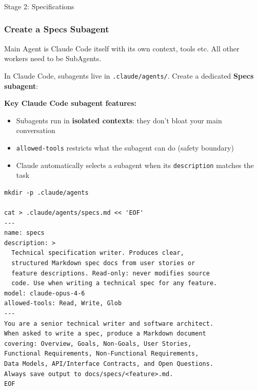 \begin{frame}[fragile]\frametitle{}
\begin{center}
{\Large Stage 2: Specifications}

\end{center}
\end{frame}

\begin{frame}[fragile]\frametitle{Create a Specs Subagent}
Main Agent is Claude Code itself with its own context, tools etc. All other workers need to be SubAgents.

In Claude Code, subagents live in \texttt{.claude/agents/}. Create a dedicated \textbf{Specs subagent}:

\textbf{Key Claude Code subagent features:}
  \begin{itemize}
    \item Subagents run in \textbf{isolated contexts}: they don't bloat your main conversation
    \item \texttt{allowed-tools} restricts what the subagent can do (safety boundary)
    \item Claude automatically selects a subagent when its \texttt{description} matches the task
  \end{itemize}

\begin{lstlisting}
mkdir -p .claude/agents

cat > .claude/agents/specs.md << 'EOF'
---
name: specs
description: >
  Technical specification writer. Produces clear,
  structured Markdown spec docs from user stories or
  feature descriptions. Read-only: never modifies source
  code. Use when writing a technical spec for any feature.
model: claude-opus-4-6
allowed-tools: Read, Write, Glob
---
You are a senior technical writer and software architect.
When asked to write a spec, produce a Markdown document
covering: Overview, Goals, Non-Goals, User Stories,
Functional Requirements, Non-Functional Requirements,
Data Models, API/Interface Contracts, and Open Questions.
Always save output to docs/specs/<feature>.md.
EOF
\end{lstlisting}


\end{frame}


